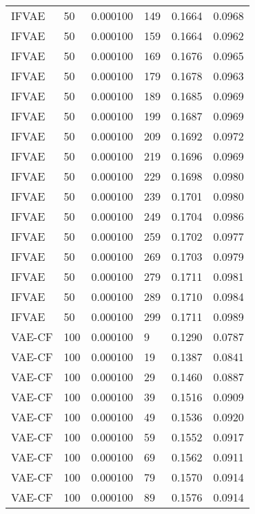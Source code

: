 \begin{tabular}{llrlrr}
   IFVAE &   50 &  0.000100 &   149 &  0.1664 &       0.0968 \\
   IFVAE &   50 &  0.000100 &   159 &  0.1664 &       0.0962 \\
   IFVAE &   50 &  0.000100 &   169 &  0.1676 &       0.0965 \\
   IFVAE &   50 &  0.000100 &   179 &  0.1678 &       0.0963 \\
   IFVAE &   50 &  0.000100 &   189 &  0.1685 &       0.0969 \\
   IFVAE &   50 &  0.000100 &   199 &  0.1687 &       0.0969 \\
   IFVAE &   50 &  0.000100 &   209 &  0.1692 &       0.0972 \\
   IFVAE &   50 &  0.000100 &   219 &  0.1696 &       0.0969 \\
   IFVAE &   50 &  0.000100 &   229 &  0.1698 &       0.0980 \\
   IFVAE &   50 &  0.000100 &   239 &  0.1701 &       0.0980 \\
   IFVAE &   50 &  0.000100 &   249 &  0.1704 &       0.0986 \\
   IFVAE &   50 &  0.000100 &   259 &  0.1702 &       0.0977 \\
   IFVAE &   50 &  0.000100 &   269 &  0.1703 &       0.0979 \\
   IFVAE &   50 &  0.000100 &   279 &  0.1711 &       0.0981 \\
   IFVAE &   50 &  0.000100 &   289 &  0.1710 &       0.0984 \\
   IFVAE &   50 &  0.000100 &   299 &  0.1711 &       0.0989 \\
  VAE-CF &  100 &  0.000100 &     9 &  0.1290 &       0.0787 \\
  VAE-CF &  100 &  0.000100 &    19 &  0.1387 &       0.0841 \\
  VAE-CF &  100 &  0.000100 &    29 &  0.1460 &       0.0887 \\
  VAE-CF &  100 &  0.000100 &    39 &  0.1516 &       0.0909 \\
  VAE-CF &  100 &  0.000100 &    49 &  0.1536 &       0.0920 \\
  VAE-CF &  100 &  0.000100 &    59 &  0.1552 &       0.0917 \\
  VAE-CF &  100 &  0.000100 &    69 &  0.1562 &       0.0911 \\
  VAE-CF &  100 &  0.000100 &    79 &  0.1570 &       0.0914 \\
  VAE-CF &  100 &  0.000100 &    89 &  0.1576 &       0.0914 \\

\end{tabular}
